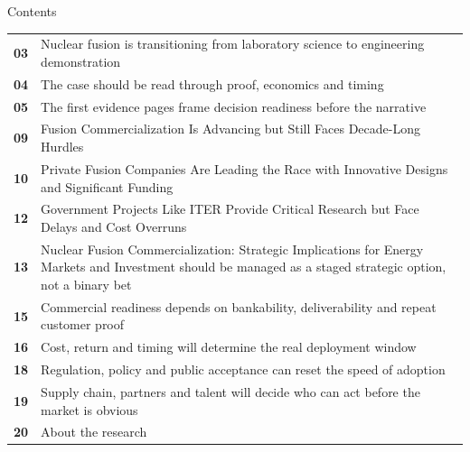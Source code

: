 \documentclass[10pt,a4paper]{article}
\begin{document}
\clearpage
{\sffamily\fontsize{26}{31}\selectfont\color{BONavy} Contents}\par\vspace{10pt}
\begin{tabularx}{\linewidth}{p{14mm}Y}
\textcolor{BOGreen}{\bfseries 03} & Nuclear fusion is transitioning from laboratory science to engineering demonstration \\[5pt]
\textcolor{BOGreen}{\bfseries 04} & The case should be read through proof, economics and timing \\[5pt]
\textcolor{BOGreen}{\bfseries 05} & The first evidence pages frame decision readiness before the narrative \\[5pt]
\textcolor{BOGreen}{\bfseries 09} & Fusion Commercialization Is Advancing but Still Faces Decade-Long Hurdles \\[5pt]
\textcolor{BOGreen}{\bfseries 10} & Private Fusion Companies Are Leading the Race with Innovative Designs and Significant Funding \\[5pt]
\textcolor{BOGreen}{\bfseries 12} & Government Projects Like ITER Provide Critical Research but Face Delays and Cost Overruns \\[5pt]
\textcolor{BOGreen}{\bfseries 13} & Nuclear Fusion Commercialization: Strategic Implications for Energy Markets and Investment should be managed as a staged strategic option, not a binary bet \\[5pt]
\textcolor{BOGreen}{\bfseries 15} & Commercial readiness depends on bankability, deliverability and repeat customer proof \\[5pt]
\textcolor{BOGreen}{\bfseries 16} & Cost, return and timing will determine the real deployment window \\[5pt]
\textcolor{BOGreen}{\bfseries 18} & Regulation, policy and public acceptance can reset the speed of adoption \\[5pt]
\textcolor{BOGreen}{\bfseries 19} & Supply chain, partners and talent will decide who can act before the market is obvious \\[5pt]
\textcolor{BOGreen}{\bfseries 20} & About the research \\[5pt]
\end{tabularx}
\clearpage
\end{document}
